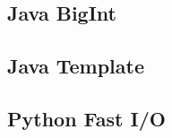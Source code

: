 \documentclass[10pt]{extarticle}
\begin{document}
\begin{multicols*}{2}
\subsection{Java BigInt} %


\subsection{Java Template} %


\subsection{Python Fast I/O} %



\end{multicols*}
\end{document}
